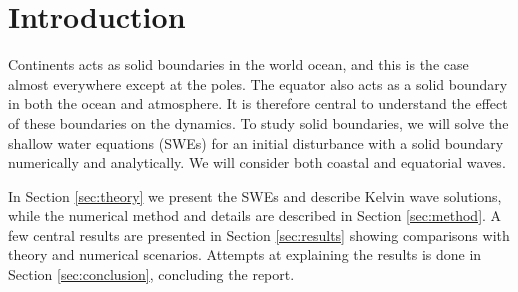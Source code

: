 \section{Introduction}
\label{sec:introduction}
Continents acts as solid boundaries in the world ocean, and this is the case almost everywhere except at the poles. The equator also acts as a solid boundary in both the ocean and atmosphere. It is therefore central to understand the effect of these boundaries on the dynamics. To study solid boundaries, we will solve the shallow water equations (SWEs) for an initial disturbance with a solid boundary numerically and analytically. We will consider both coastal and equatorial waves.

In Section \ref{sec:theory} we present the SWEs and describe Kelvin wave solutions, while the numerical method and details are described in Section \ref{sec:method}. A few central results are presented in Section \ref{sec:results} showing comparisons with theory and numerical scenarios. Attempts at explaining the results is done in Section \ref{sec:conclusion}, concluding the report.
